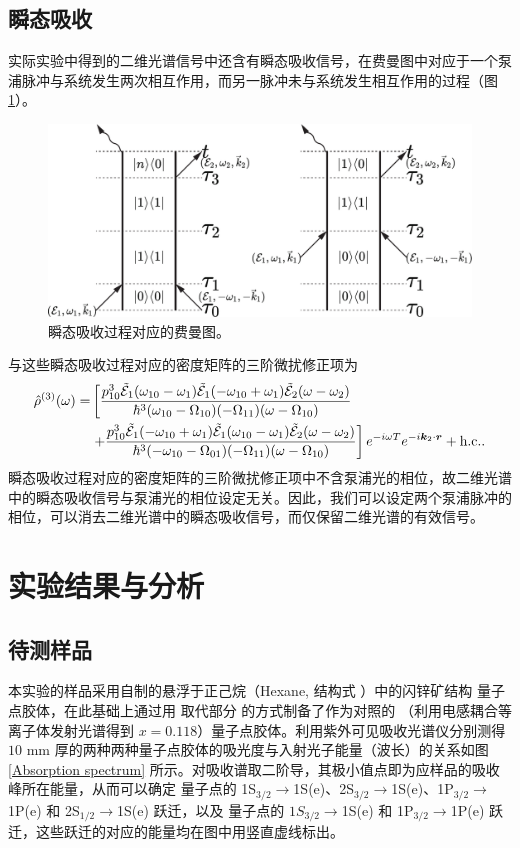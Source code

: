 \documentclass{thesis}
\begin{document}
\section{瞬态吸收}
实际实验中得到的二维光谱信号中还含有瞬态吸收信号，在费曼图中对应于一个泵浦脉冲与系统发生两次相互作用，而另一脉冲未与系统发生相互作用的过程（图 \ref{Feynman Diagram-Transient Absorption}）。
\begin{figure}[h]
    \centering
    \includegraphics[width=.5\columnwidth]{Img/Feynman Diagram-Transient Absorption.pdf}
    \caption{瞬态吸收过程对应的费曼图。}
    \label{Feynman Diagram-Transient Absorption}
\end{figure}

与这些瞬态吸收过程对应的密度矩阵的三阶微扰修正项为
\begin{align}
    \notag\hat{\rho}^{(3)}(\omega)=&\left[\frac{p_{10}^3\tilde{\mathcal{E}}_1(\omega_{10}-\omega_1)\tilde{\mathcal{E}}_1(-\omega_{10}+\omega_1)\tilde{\mathcal{E}}_2(\omega-\omega_2)}{\hbar^3(\omega_{10}-\Omega_{10})(-\Omega_{11})(\omega-\Omega_{10})}\right.\\
    &\left.+\frac{p_{10}^3\tilde{\mathcal{E}}_1(-\omega_{10}+\omega_1)\tilde{\mathcal{E}}_1(\omega_{10}-\omega_1)\tilde{\mathcal{E}}_2(\omega-\omega_2)}{\hbar^3(-\omega_{10}-\Omega_{01})(-\Omega_{11})(\omega-\Omega_{10})}\right]e^{-i\omega T}e^{-i\bm{k}_2\cdot\bm{r}}+\text{h.c.}.
\end{align}
瞬态吸收过程对应的密度矩阵的三阶微扰修正项中不含泵浦光的相位，故二维光谱中的瞬态吸收信号与泵浦光的相位设定无关。因此，我们可以设定两个泵浦脉冲的相位，可以消去二维光谱中的瞬态吸收信号，而仅保留二维光谱的有效信号。

\chapter{实验结果与分析}
\section{待测样品}
本实验的样品采用自制的悬浮于正己烷（Hexane, 结构式 ）中的闪锌矿结构  量子点胶体，在此基础上通过用  取代部分  的方式制备了作为对照的  （利用电感耦合等离子体发射光谱得到 $x=0.118$）量子点胶体。利用紫外可见吸收光谱仪分别测得 $10$ mm 厚的两种两种量子点胶体的吸光度与入射光子能量（波长）的关系如图 \ref{Absorption spectrum} 所示。对吸收谱取二阶导，其极小值点即为应样品的吸收峰所在能量，从而可以确定  量子点的 1S$_{3/2}\rightarrow$1S(e)、2S$_{3/2}\rightarrow$1S(e)、1P$_{3/2}\rightarrow$1P(e) 和 2S$_{1/2}\rightarrow$1S(e) 跃迁，以及  量子点的 $1S_{3/2}\rightarrow$1S(e) 和 1P$_{3/2}\rightarrow$1P(e) 跃迁，这些跃迁的对应的能量均在图中用竖直虚线标出。
\end{document}
